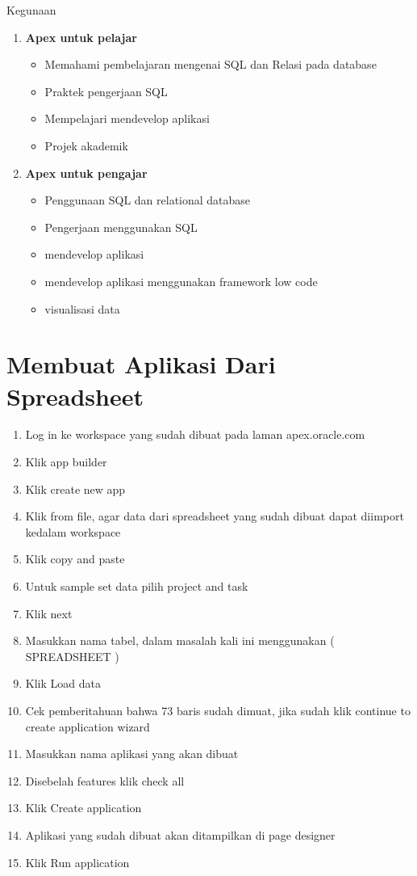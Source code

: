 Kegunaan
\begin{enumerate}
\item \textbf{Apex untuk pelajar} 
\begin{itemize}
\item Memahami pembelajaran mengenai SQL dan Relasi pada database
\item Praktek pengerjaan SQL
\item Mempelajari mendevelop aplikasi
\item Projek akademik
\end{itemize}

\item \textbf{Apex untuk pengajar}
\begin{itemize}
\item Penggunaan SQL dan relational database
\item Pengerjaan menggunakan SQL
\item mendevelop aplikasi
\item mendevelop aplikasi menggunakan framework low code
\item visualisasi data
\end{itemize}

\end{enumerate}


\section{Membuat Aplikasi Dari Spreadsheet}
\begin{enumerate}
\item Log in ke workspace yang sudah dibuat pada laman apex.oracle.com
\item Klik app builder
\item Klik create new app
\item Klik from file, agar data dari spreadsheet yang sudah dibuat dapat diimport kedalam workspace
\item Klik copy and paste
\item Untuk sample set data pilih project and task
\item Klik next
\item Masukkan nama tabel, dalam masalah kali ini menggunakan ( SPREADSHEET )
\item Klik Load data
\item Cek pemberitahuan bahwa 73 baris sudah dimuat, jika sudah klik continue to create application wizard
\item Masukkan nama aplikasi yang akan dibuat
\item Disebelah features klik check all
\item Klik Create application
\item Aplikasi yang sudah dibuat akan ditampilkan di page designer
\item Klik Run application
\end{enumerate}

